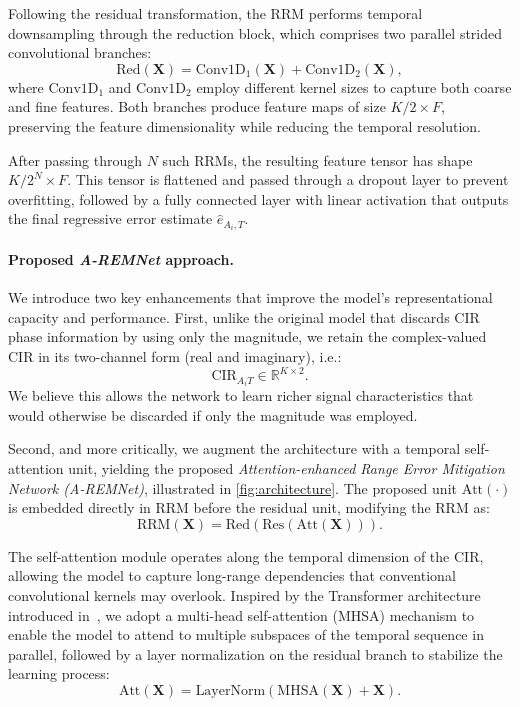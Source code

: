 Following the residual transformation, the RRM performs temporal downsampling through the reduction block, which comprises two parallel strided convolutional branches:
\begin{equation}
    \text{Red}(\mathbf{X}) = \text{Conv1D}_1(\mathbf{X}) + \text{Conv1D}_2(\mathbf{X}),
\end{equation}
where $\text{Conv1D}_1$ and $\text{Conv1D}_2$ employ different kernel sizes to capture both coarse and fine features. Both branches produce feature maps of size $K/2 \times F$, preserving the feature dimensionality while reducing the temporal resolution.

After passing through $N$ such RRMs, the resulting feature tensor has shape $K / 2^N \times F$. This tensor is flattened and passed through a dropout layer to prevent overfitting, followed by a fully connected layer with linear activation that outputs the final regressive error estimate $\hat{e}_{A_i,T}$.

\paragraph{Proposed \emph{A-REMNet} approach.}
We introduce two key enhancements that improve the model's representational capacity and performance. First, unlike the original model that discards CIR phase information by using only the magnitude, we retain the complex-valued CIR in its two-channel form (real and imaginary), i.e.: 
\begin{equation}
    \text{CIR}_{A_iT} \in \mathbb{R}^{K \times 2}.
\end{equation}
We believe this allows the network to learn richer signal characteristics that would otherwise be discarded if only the magnitude was employed.

Second, and more critically, we augment the architecture with a temporal self-attention unit, yielding the proposed \emph{Attention-enhanced Range Error Mitigation Network (A-REMNet)}, illustrated in \autoref{fig:architecture}. The proposed unit $\text{Att}(\cdot)$ is embedded directly in RRM before the residual unit, modifying the RRM as:
\begin{equation}
    \text{RRM}(\mathbf{X}) = \text{Red}(\text{Res}(\text{Att}(\mathbf{X}))).
\end{equation}

The self-attention module operates along the temporal dimension of the CIR, allowing the model to capture long-range dependencies that conventional convolutional kernels may overlook. Inspired by the Transformer architecture introduced in~\cite{attention}, we adopt a multi-head self-attention (MHSA) mechanism to enable the model to attend to multiple subspaces of the temporal sequence in parallel, followed by a layer normalization on the residual branch to stabilize the learning process:
\begin{equation}
    \text{Att}(\mathbf{X}) = \text{LayerNorm}(\text{MHSA}(\mathbf{X}) + \mathbf{X}).
\end{equation}

